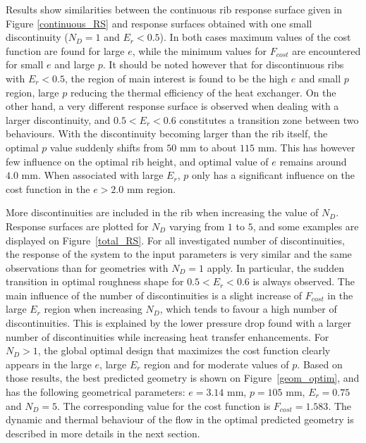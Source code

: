 Results show similarities between the continuous rib response surface given in Figure \ref{continuous_RS} and response surfaces obtained with one small discontinuity ($N_D=1$ and $E_r < 0.5$). In both cases maximum values of the cost function are found for large $e$, while the minimum values for $F_{cost}$ are encountered for small $e$ and large $p$. It should be noted however that for discontinuous ribs with $E_r < 0.5$, the region of main interest is found to be the high $e$ and small $p$ region, large $p$ reducing the thermal efficiency of the heat exchanger. On the other hand, a very different response surface is observed when dealing with a larger discontinuity, and $0.5 < E_r < 0.6$ constitutes a transition zone between two behaviours. With the discontinuity becoming larger than the rib itself, the optimal $p$ value suddenly shifts from $50$ mm to about $115$ mm. This has however few influence on the optimal rib height, and optimal value of $e$ remains around $4.0$ mm. When associated with large $E_r$, $p$ only has a significant influence on the cost function in the $e > 2.0$ mm region.

More discontinuities are included in the rib when increasing the value of $N_D$. Response surfaces are plotted for $N_D$ varying from $1$ to $5$, and some examples are displayed on Figure~\ref{total_RS}. For all investigated number of discontinuities, the response of the system to the input parameters is very similar and the same observations than for geometries with $N_D=1$ apply. In particular, the sudden transition in optimal roughness shape for $0.5 < E_r < 0.6$ is always observed. The main influence of the number of discontinuities is a slight increase of $F_{cost}$ in the large $E_r$ region when increasing $N_D$, which tends to favour a high number of discontinuities. This is explained by the lower pressure drop found with a larger number of discontinuities while increasing heat transfer enhancements. For $N_D > 1$, the global optimal design that maximizes the cost function clearly appears in the large $e$, large $E_r$ region and for moderate values of $p$. Based on those results, the best predicted geometry is shown on Figure~\ref{geom_optim}, and has the following geometrical parameters: $e=3.14$ mm, $p=105$ mm, $E_r=0.75$ and $N_D=5$. The corresponding value for the cost function is $F_{cost}=1.583$. The dynamic and thermal behaviour of the flow in the optimal predicted geometry is described in more details in the next section.

